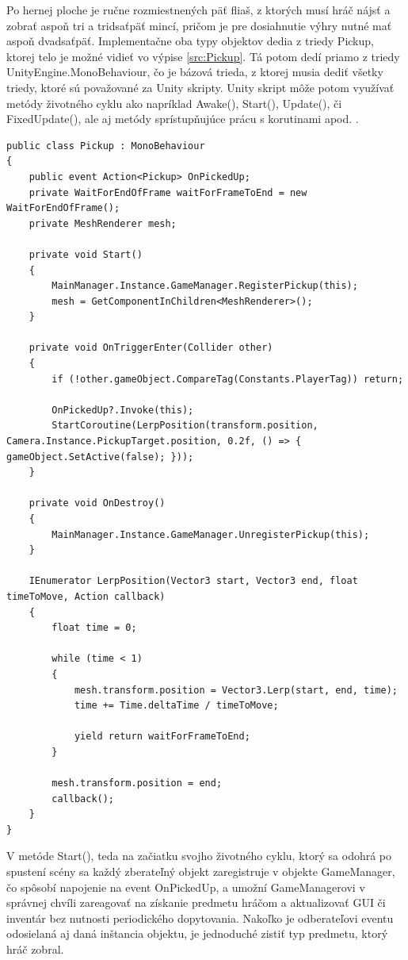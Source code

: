 \documentclass[slovak, master]{diploma}
\begin{document}
Po hernej ploche je ručne rozmiestnených päť fliaš, z ktorých musí hráč nájsť a zobrať aspoň tri a tridsaťpäť mincí, pričom je pre dosiahnutie výhry nutné mať aspoň dvadsaťpäť. Implementačne oba typy objektov dedia z triedy Pickup, ktorej telo je možné vidieť vo výpise \ref{src:Pickup}. Tá potom dedí priamo z triedy UnityEngine.MonoBehaviour, čo je bázová trieda, z ktorej musia dediť všetky triedy, ktoré sú považované za Unity skripty. Unity skript môže potom využívať metódy životného cyklu ako napríklad Awake(), Start(), Update(), či FixedUpdate(), ale aj metódy sprístupňujúce prácu s korutinami apod. \cite{MonoBehaviour}.
\vspace{8pt}
\begin{lstlisting}[label=src:Pickup,caption={Trieda Pickup slúžiaca ako predok všetkých zberateľných predmetov v hre}]
public class Pickup : MonoBehaviour
{
    public event Action<Pickup> OnPickedUp;
    private WaitForEndOfFrame waitForFrameToEnd = new WaitForEndOfFrame();
    private MeshRenderer mesh;

    private void Start() 
    {
        MainManager.Instance.GameManager.RegisterPickup(this);
        mesh = GetComponentInChildren<MeshRenderer>();
    }
    
    private void OnTriggerEnter(Collider other) 
    {
        if (!other.gameObject.CompareTag(Constants.PlayerTag)) return;

        OnPickedUp?.Invoke(this);
        StartCoroutine(LerpPosition(transform.position, Camera.Instance.PickupTarget.position, 0.2f, () => { gameObject.SetActive(false); }));
    }
    
    private void OnDestroy() 
    {
        MainManager.Instance.GameManager.UnregisterPickup(this);
    }
    
    IEnumerator LerpPosition(Vector3 start, Vector3 end, float timeToMove, Action callback) 
    {
        float time = 0;

        while (time < 1)
        {
            mesh.transform.position = Vector3.Lerp(start, end, time);
            time += Time.deltaTime / timeToMove;

            yield return waitForFrameToEnd;
        }

        mesh.transform.position = end;
        callback();
    }
}
\end{lstlisting}

V metóde Start(), teda na začiatku svojho životného cyklu, ktorý sa odohrá po spustení scény sa každý zberateľný objekt zaregistruje v objekte GameManager, čo spôsobí napojenie na event OnPickedUp, a umožní GameManagerovi v správnej chvíli zareagovať na získanie predmetu hráčom a aktualizovať GUI či inventár bez nutnosti periodického dopytovania. Nakoľko je odberateľovi eventu odosielaná aj daná inštancia objektu, je jednoduché zistiť typ predmetu, ktorý hráč zobral.
\end{document}
